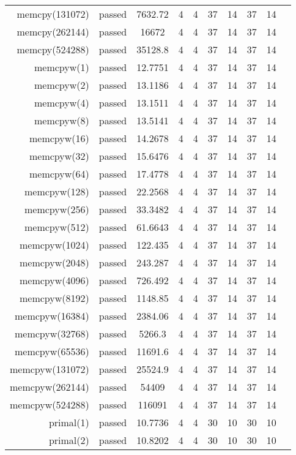 \begin{longtable}{r|ccccccccc}
    memcpy(131072) & passed & 7632.72 & 4 & 4 & 37 & 14 & 37 & 14 \\
    memcpy(262144) & passed & 16672 & 4 & 4 & 37 & 14 & 37 & 14 \\
    memcpy(524288) & passed & 35128.8 & 4 & 4 & 37 & 14 & 37 & 14 \\
    memcpyw(1) & passed & 12.7751 & 4 & 4 & 37 & 14 & 37 & 14 \\
    memcpyw(2) & passed & 13.1186 & 4 & 4 & 37 & 14 & 37 & 14 \\
    memcpyw(4) & passed & 13.1511 & 4 & 4 & 37 & 14 & 37 & 14 \\
    memcpyw(8) & passed & 13.5141 & 4 & 4 & 37 & 14 & 37 & 14 \\
    memcpyw(16) & passed & 14.2678 & 4 & 4 & 37 & 14 & 37 & 14 \\
    memcpyw(32) & passed & 15.6476 & 4 & 4 & 37 & 14 & 37 & 14 \\
    memcpyw(64) & passed & 17.4778 & 4 & 4 & 37 & 14 & 37 & 14 \\
    memcpyw(128) & passed & 22.2568 & 4 & 4 & 37 & 14 & 37 & 14 \\
    memcpyw(256) & passed & 33.3482 & 4 & 4 & 37 & 14 & 37 & 14 \\
    memcpyw(512) & passed & 61.6643 & 4 & 4 & 37 & 14 & 37 & 14 \\
    memcpyw(1024) & passed & 122.435 & 4 & 4 & 37 & 14 & 37 & 14 \\
    memcpyw(2048) & passed & 243.287 & 4 & 4 & 37 & 14 & 37 & 14 \\
    memcpyw(4096) & passed & 726.492 & 4 & 4 & 37 & 14 & 37 & 14 \\
    memcpyw(8192) & passed & 1148.85 & 4 & 4 & 37 & 14 & 37 & 14 \\
    memcpyw(16384) & passed & 2384.06 & 4 & 4 & 37 & 14 & 37 & 14 \\
    memcpyw(32768) & passed & 5266.3 & 4 & 4 & 37 & 14 & 37 & 14 \\
    memcpyw(65536) & passed & 11691.6 & 4 & 4 & 37 & 14 & 37 & 14 \\
    memcpyw(131072) & passed & 25524.9 & 4 & 4 & 37 & 14 & 37 & 14 \\
    memcpyw(262144) & passed & 54409 & 4 & 4 & 37 & 14 & 37 & 14 \\
    memcpyw(524288) & passed & 116091 & 4 & 4 & 37 & 14 & 37 & 14 \\
    primal(1) & passed & 10.7736 & 4 & 4 & 30 & 10 & 30 & 10 \\
    primal(2) & passed & 10.8202 & 4 & 4 & 30 & 10 & 30 & 10 \\

\end{longtable}
